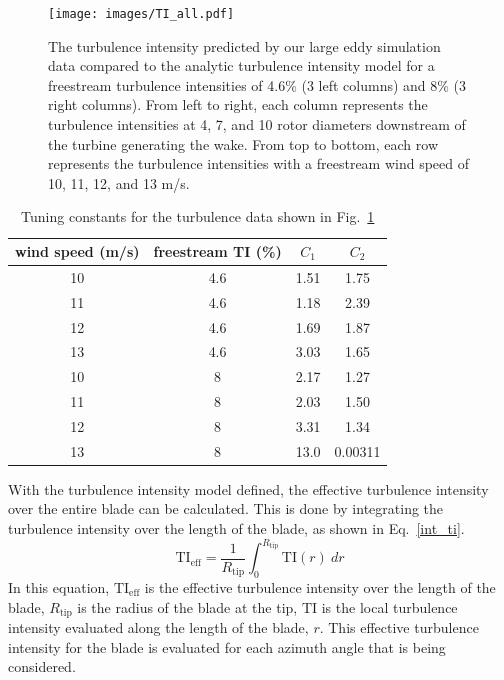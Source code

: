 \documentclass[11pt,letterpaper]{article}
\begin{document}
\begin{figure}
    \centering
    \texttt{[image: images/TI\_all.pdf]}
    \caption{The turbulence intensity predicted by our large eddy simulation data compared to the analytic turbulence intensity model for a freestream turbulence intensities of 4.6\% (3 left columns) and 8\% (3 right columns). From left to right, each column represents the turbulence intensities at 4, 7, and 10 rotor diameters downstream of the turbine generating the wake. From top to bottom, each row represents the turbulence intensities with a freestream wind speed of 10, 11, 12, and 13 m/s.}
    \label{TI_all}
\end{figure}

\begin{table}
\begin{center}
\caption{Tuning constants for the turbulence data shown in Fig.~\ref{TI_all} \label{tune_turb}}
\begin{tabular}{cc|cc}
   wind speed (m/s) & freestream TI (\%)& $C_1$ & $C_2$\\\midrule 
   10 & 4.6 & 1.51 & 1.75 \\
   11 & 4.6 & 1.18 & 2.39 \\
   12 & 4.6 & 1.69 & 1.87 \\
   13 & 4.6 & 3.03 & 1.65 \\
   10 & 8 & 2.17 & 1.27 \\
   11 & 8 & 2.03 & 1.50 \\
   12 & 8 & 3.31 & 1.34 \\
   13 & 8 & 13.0 & 0.00311
\end{tabular}
\end{center}
\end{table}

With the turbulence intensity model defined, the effective turbulence intensity over the entire blade can be calculated. This is done by integrating the turbulence intensity over the length of the blade, as shown in Eq.~\ref{int_ti}.
%
\begin{equation}
    \label{int_ti}
    \text{TI}_{\text{eff}} = \frac{1}{R_{\text{tip}}}\int_0^{R_\text{tip}} \text{TI}(r)~dr
\end{equation}
%
In this equation, $\text{TI}_{\text{eff}}$ is the effective turbulence intensity over the length of the blade, $R_{\text{tip}}$ is the radius of the blade at the tip, $\text{TI}$ is the local turbulence intensity evaluated along the length of the blade, $r$. This effective turbulence intensity for the blade is evaluated for each azimuth angle that is being considered.
\end{document}
